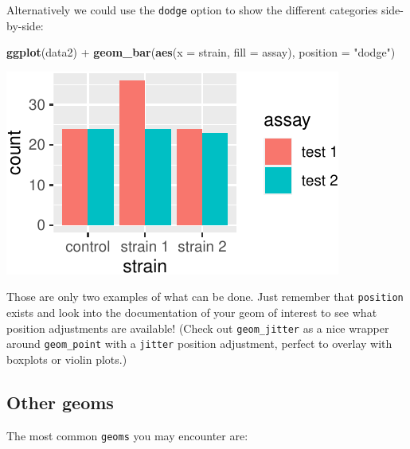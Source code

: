 \documentclass[]{book}
\newenvironment{Shaded}{}{}
\newcommand{\DataTypeTok}[1]{\textcolor[rgb]{0.56,0.13,0.00}{#1}}
\newcommand{\KeywordTok}[1]{\textcolor[rgb]{0.00,0.44,0.13}{\textbf{#1}}}
\newcommand{\NormalTok}[1]{#1}
\newcommand{\OperatorTok}[1]{\textcolor[rgb]{0.40,0.40,0.40}{#1}}
\newcommand{\StringTok}[1]{\textcolor[rgb]{0.25,0.44,0.63}{#1}}
\begin{document}
Alternatively we could use the \texttt{dodge} option to show the different categories side-by-side:

\begin{Shaded}
\begin{Highlighting}[]
\KeywordTok{ggplot}\NormalTok{(data2) }\OperatorTok{+}
\StringTok{  }\KeywordTok{geom_bar}\NormalTok{(}\KeywordTok{aes}\NormalTok{(}\DataTypeTok{x =}\NormalTok{ strain, }\DataTypeTok{fill =}\NormalTok{ assay), }\DataTypeTok{position =} \StringTok{"dodge"}\NormalTok{)}
\end{Highlighting}
\end{Shaded}

\begin{center}\includegraphics[width=\textwidth]{TRES-Tidy-Tutorial_files/figure-latex/unnamed-chunk-118-1} \end{center}

Those are only two examples of what can be done. Just remember that \texttt{position} exists and look into the documentation of your geom of interest to see what position adjustments are available! (Check out \texttt{geom\_jitter} as a nice wrapper around \texttt{geom\_point} with a \texttt{jitter} position adjustment, perfect to overlay with boxplots or violin plots.)

\hypertarget{other-geoms}{%
\subsection{Other geoms}\label{other-geoms}}

The most common \texttt{geoms} you may encounter are:
\end{document}
